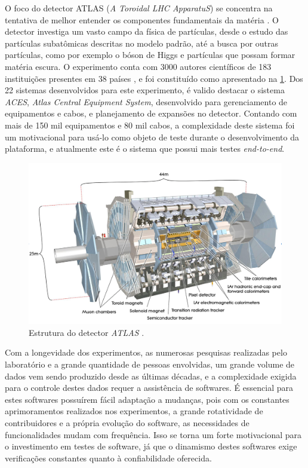 O foco do detector ATLAS (\emph{A Toroidal LHC ApparatuS}) se concentra na tentativa de melhor entender os componentes fundamentais da matéria \cite{cernsiteatlas}. O detector investiga um vasto campo da física de partículas, desde o estudo das partículas subatômicas descritas no modelo padrão, até a busca por outras partículas, como por exemplo o bóson de Higgs e partículas que possam formar matéria escura. O experimento conta com 3000 autores científicos de 183 instituições presentes em 38 países \cite{cernsiteabout}, e foi constituído como apresentado na \ref{fig:atlas-detector}. Dos 22 sistemas desenvolvidos para este experimento, é valido destacar o sistema \emph{ACES}, \emph{Atlas Central Equipment System}, desenvolvido para gerenciamento de equipamentos e cabos, e planejamento de expansões no detector. Contando com mais de 150 mil equipamentos e 80 mil cabos, a complexidade deste sistema foi um motivacional para usá-lo como objeto de teste durante o desenvolvimento da plataforma, e atualmente este é o sistema que possui mais testes \emph{end-to-end}.

\begin{figure}[H]
    \centering
    \includegraphics[width=14cm]{source/2-contextualizacao/images/atlas-detector.png}
    \caption{Estrutura do detector \emph{ATLAS} \cite{atlas}.}
    \label{fig:atlas-detector}
\end{figure}

Com a longevidade dos experimentos, as numerosas pesquisas realizadas pelo laboratório e a grande quantidade de pessoas envolvidas, um grande volume de dados vem sendo produzido desde as últimas décadas, e a complexidade exigida para o controle destes dados requer a assistência de softwares. É essencial para estes softwares possuírem fácil adaptação a mudanças, pois com os constantes aprimoramentos realizados nos experimentos, a grande rotatividade de contribuidores e a própria evolução do software, as necessidades de funcionalidades mudam com frequência. Isso se torna um forte motivacional para o investimento em testes de software, já que o dinamismo destes softwares exige verificações constantes quanto à confiabilidade oferecida.

